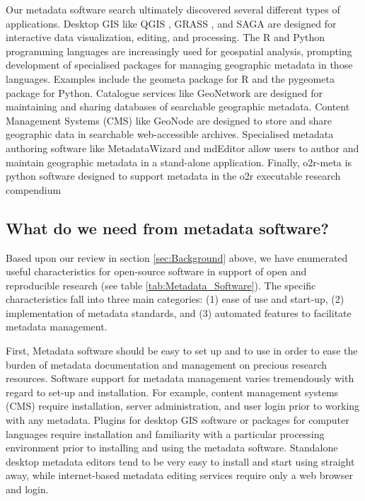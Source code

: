 \documentclass{isprs} %
\begin{document}
Our metadata software search ultimately discovered several different types of applications.
Desktop GIS like QGIS \citep{QGIS2022}, GRASS \citep{grass2020}, and SAGA \citep{gmd-8-1991-2015} are designed for interactive data visualization, editing, and processing.
The R and Python programming languages are increasingly used for geospatial analysis, prompting development of specialised packages for managing geographic metadata in those languages. Examples include the geometa package \citep{blondel_2022} for R and the pygeometa package \citep{pygeometa} for Python.
Catalogue services like GeoNetwork \cite{geonetwork} are designed for maintaining and sharing databases of searchable geographic metadata.
Content Management Systems (CMS) like GeoNode \cite{geonode} are designed to store and share geographic data in searchable web-accessible archives.
Specialised metadata authoring software like MetadataWizard \citep{usgs} and mdEditor \citep{ADIwg} allow users to author and maintain geographic metadata in a stand-alone application.
Finally, o2r-meta \citep{nust_daniel_2021_5106499} is python software designed to support metadata in the o2r executable research compendium

\subsection{What do we need from metadata software?}\label{metadataneeds}

Based upon our review in section \ref{sec:Background} above, we have enumerated useful characteristics for open-source software in support of open and reproducible research (see table \ref{tab:Metadata_Software}).
The specific characteristics fall into three main categories: (1) ease of use and start-up, (2) implementation of metadata standards, and (3) automated features to facilitate metadata management.

First, Metadata software should be easy to set up and to use in order to ease the burden of metadata documentation and management on precious research resources.
Software support for metadata management varies tremendously with regard to set-up and installation.
For example, content management systems (CMS) require installation, server administration, and user login prior to working with any metadata. 
Plugins for desktop GIS software or packages for computer languages require installation and familiarity with a particular  processing environment prior to installing and using the metadata software. 
Standalone desktop metadata editors tend to be very easy to install and start using straight away, while internet-based metadata editing services require only a web browser and login.
\end{document}
